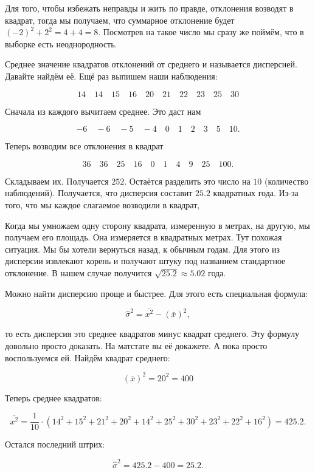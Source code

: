 \documentclass[12pt, a4paper, oneside]{article}
\begin{document}
\begin{sol}
\begin{enumerate}
	Для того, чтобы избежать неправды и жить по правде, отклонения возводят в квадрат, тогда мы получаем, что суммарное отклонение будет $(-2)^2 + 2^2 = 4 + 4 = 8$. Посмотрев на такое число мы сразу же поймём, что в выборке есть неоднородность. 
	
	Среднее значение квадратов отклонений от среднего и называется дисперсией. Давайте найдём её. Ещё раз выпишем наши наблюдения: 	

	\[
	14 \quad 14  \quad 15  \quad 16  \quad 20  \quad 21  \quad 22  \quad 23  \quad 25  \quad 30
	\]
	
	Сначала из каждого вычитаем среднее. Это даст нам
	
	\[
	-6 \quad -6  \quad -5  \quad -4  \quad 0  \quad 1 \quad 2  \quad 3  \quad 5  \quad 10.
	\]
	
	Теперь возводим все отклонения в квадрат
	
	\[
	36 \quad 36  \quad 25  \quad 16 \quad 0  \quad 1 \quad 4  \quad 9 \quad 25  \quad 100.
	\]
	
	Складываем их.  Получается $252$. Остаётся разделить это число на  $10$ (количество наблюдений). Получается, что дисперсия составит $25.2$ квадратных года.  Из-за того, что мы каждое слагаемое возводили в квадрат, 
	
	Когда мы умножаем одну сторону квадрата, измеренную в метрах, на другую, мы получаем его площадь. Она измеряется в квадратных метрах. Тут похожая ситуация. Мы бы хотели вернуться назад, к обычным годам. Для этого из дисперсии извлекают корень и получают штуку под названием стандартное отклонение. В нашем случае получится $\sqrt{25.2} \approx 5.02$ года. 
	
	
	Можно найти дисперсию проще и быстрее. Для этого есть специальная формула: 

	$$
	\hat \sigma^2 = \overline{x^2} - (\bar x)^2,
	$$
	
	то есть дисперсия это среднее квадратов минус квадрат среднего. Эту формулу довольно просто доказать. На матстате вы её докажете. А пока просто воспользуемся ей. Найдём квадрат среднего:
	
	$$
	(\bar x)^2 = 20^2 = 400
	$$
	
	Теперь среднее квадратов: 	
	
	$$
	\overline{x^2} = \frac{1}{10} \cdot (14^2 + 15^2 + 21^2 + 20^2 + 14^2 + 25^2 + 30^2 + 23^2 + 22^2 + 16^2) = 425.2.
	$$
	
	Остался последний штрих: 
	
	$$
	\hat \sigma^2 = 425.2 - 400 = 25.2.
	$$
	

\end{enumerate}
\end{sol}
\end{document}
